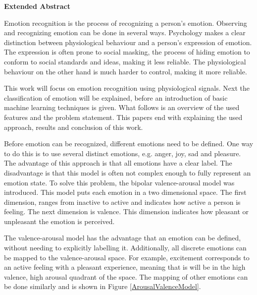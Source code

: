 \textbf{\huge Extended Abstract}

\npar
\npar
Emotion recognition is the process of recognizing a person's emotion. Observing and recognizing emotion can be done in several ways. Psychology makes a clear distinction between physiological behaviour and a person's expression of emotion. The expression is often prone to social masking, the process of hiding emotion to conform to social standards and ideas, making it less reliable. The physiological behaviour on the other hand is much harder to control, making it more reliable. 

\npar

This work will focus on emotion recognition using physiological signals. Next the classification of emotion will be explained, before an introduction of basic machine learning techniques is given. What follows is an overview of the used features and the problem statement. This papers end with explaining the used approach, results and conclusion of this work.

\npar

Before emotion can be recognized, different emotions need to be defined. One way to do this is to use several distinct emotions, e.g. anger, joy, sad and pleasure. The advantage of this approach is that all emotions have a clear label. The disadvantage is that this model is often not complex enough to fully represent an emotion state. To solve this problem, the bipolar valence-arousal model was introduced. This model puts each emotion in a two dimensional space. The first dimension, ranges from inactive to active and indicates how active a person is feeling. The next dimension is valence. This dimension indicates how pleasant or unpleasant the emotion is perceived. 

\npar

The valence-arousal model has the advantage that an emotion can be defined, without needing to explicitly labelling it. Additionally, all discrete emotions can be mapped to the valence-arousal space. For example, excitement corresponds to an active feeling with a pleasant experience, meaning that is will be in the high valence, high arousal quadrant of the space. The mapping of other emotions can be done similarly and is shown in Figure \ref{ArousalValenceModel}.


